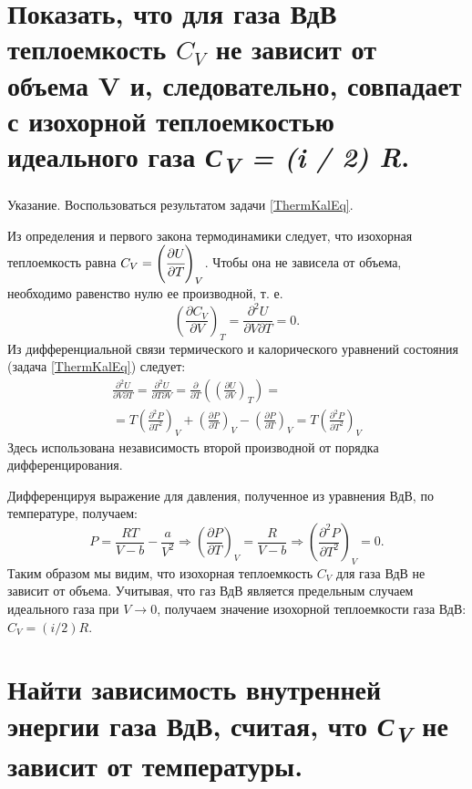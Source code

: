 \section{Показать, что для газа ВдВ теплоемкость $C_V$ не зависит от объема V и,
следовательно, совпадает с изохорной теплоемкостью идеального газа
\emph{С\textsubscript{V} = (i / 2) R}.} Указание. Воспользоваться
результатом задачи \ref{ThermKalEq}.

\solving{}

Из определения и первого закона термодинамики следует, что изохорная
теплоемкость равна $C_V = \left ( \cfrac{\partial U}{\partial T} \right )_V$. Чтобы она не
зависела от объема, необходимо равенство нулю ее производной, т. е.
\begin{equation}
  \left ( \frac{\partial C_V}{\partial V} \right )_T = \frac{\partial^2 U}{\partial V \partial T} =0.
\end{equation}
Из дифференциальной связи термического и калорического уравнений
состояния (задача \ref{ThermKalEq}) следует:
\begin{eqnarray}
  \frac{\partial^2 U}{\partial V \partial T} = \frac{\partial^2 U}{\partial T \partial V} = \frac{\partial}{\partial T} \left ( \left (\frac{\partial U}{\partial V}\right )_T \right ) = \nonumber \\
  = T \left (\frac{\partial^2 P}{\partial T^2}\right )_V + \left (\frac{\partial P}{\partial T}\right )_V - \left (\frac{\partial P}{\partial T}\right )_V = T \left (\frac{\partial^2 P}{\partial T^2}\right )_V
\end{eqnarray}
Здесь использована независимость второй производной от порядка
дифференцирования.

Дифференцируя выражение для давления, полученное из уравнения ВдВ, по
температуре, получаем:
\begin{equation}
  P = \frac{RT}{V-b} - \frac{a}{V^2} \Rightarrow \left (\frac{\partial P}{\partial T} \right )_V = \frac{R}{V-b} \Rightarrow \left (\frac{\partial^2 P}{\partial T^2} \right )_V = 0.
\end{equation}
Таким образом мы видим, что изохорная теплоемкость $C_V$ для газа ВдВ не зависит от объема. Учитывая, что газ ВдВ является предельным случаем идеального газа при $V \rightarrow
0$, получаем значение изохорной теплоемкости газа ВдВ:
$C_V = (i/2) R$.

\section{Найти зависимость внутренней энергии газа ВдВ, считая, что
\emph{С\textsubscript{V}} не зависит от температуры.}

